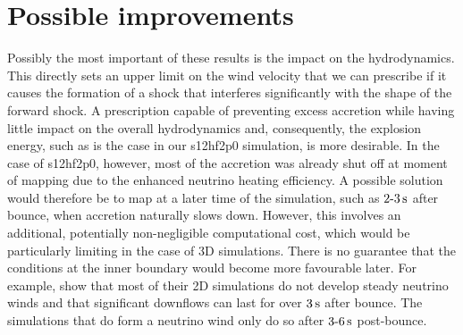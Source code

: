 \section{Possible improvements}

Possibly the most important of these results is the impact on the hydrodynamics. This directly sets an upper limit on the wind velocity that we can prescribe if it causes the formation of a shock that interferes significantly with the shape of the forward shock. A prescription capable of preventing excess accretion while having little impact on the overall hydrodynamics and, consequently, the explosion energy, such as is the case in our s12hf2p0 simulation, is more desirable. In the case of s12hf2p0, however, most of the accretion was already shut off at moment of mapping due to the enhanced neutrino heating efficiency. A possible solution would therefore be to map at a later time of the simulation, such as \(2\text{-}3\,\mathrm{s}\) after bounce, when accretion naturally slows down. However, this involves an additional, potentially non-negligible computational cost, which would be particularly limiting in the case of 3D simulations. There is no guarantee that the conditions at the inner boundary would become more favourable later. For example, \cite{Witt2021} show that most of their 2D simulations do not develop steady neutrino winds and that significant downflows can last for over \(3\,\mathrm{s}\) after bounce. The simulations that do form a neutrino wind only do so after \(3\text{-}6\,\mathrm{s}\) post-bounce.


